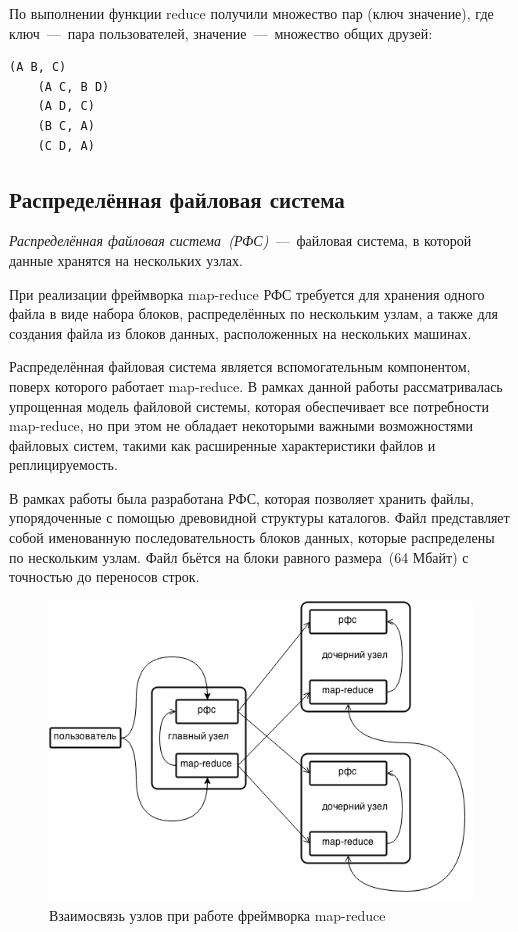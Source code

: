 \documentclass[12pt,a4paper,oneside]{extarticle}
\begin{document}
        По выполнении функции reduce получили множество пар (ключ значение), где ключ~---~пара пользователей, значение~---~множество общих друзей:

            \lstset{}
            \begin{lstlisting}[mathescape] 
    (A B, C)
    (A C, B D)
    (A D, C)
    (B C, A)
    (C D, A)
            \end{lstlisting}

    \subsection{Распределённая файловая система}
        {\it Распределённая файловая система~(РФС)}~---~файловая система, в которой данные хранятся на нескольких узлах. 

        При реализации фреймворка map-reduce РФС требуется для хранения одного файла в виде набора блоков, распределённых по нескольким узлам, а также для создания файла из блоков данных, расположенных на нескольких машинах.

        Распределённая файловая система является вспомогательным компонентом, поверх которого работает map-reduce. В рамках данной работы рассматривалась упрощенная модель файловой системы, которая обеспечивает все потребности map-reduce, но при этом не обладает некоторыми важными возможностями файловых систем, такими как расширенные характеристики файлов и реплицируемость.

        В рамках работы была разработана РФС, которая позволяет хранить файлы, упорядоченные с помощью древовидной структуры каталогов. Файл представляет собой именованную последовательность блоков данных, которые распределены по нескольким узлам. Файл бьётся на блоки равного размера~(64 Мбайт) с точностью до переносов строк.

        \begin{figure}[h!]
            \centering
            \includegraphics[scale=0.75]{framework_total.png}
            \caption{Взаимосвязь узлов при работе фреймворка map-reduce}
            \label{pic:framework}
        \end{figure}
        
\end{document}
